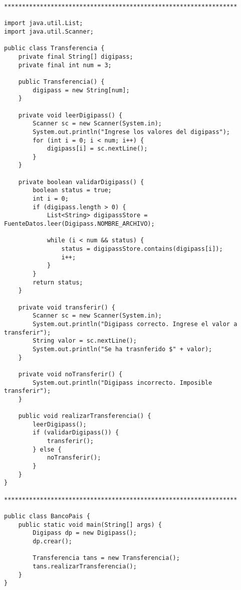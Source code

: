 \documentclass[10pt]{article}
\begin{document}
{\begin{enumerate}
\begin{verbatim}
*****************************************************************

import java.util.List;
import java.util.Scanner;

public class Transferencia {
    private final String[] digipass;
    private final int num = 3;

    public Transferencia() {
        digipass = new String[num];
    }

    private void leerDigipass() {
        Scanner sc = new Scanner(System.in);
        System.out.println("Ingrese los valores del digipass");
        for (int i = 0; i < num; i++) {
            digipass[i] = sc.nextLine();
        }
    }

    private boolean validarDigipass() {
        boolean status = true;
        int i = 0;
        if (digipass.length > 0) {
            List<String> digipassStore = FuenteDatos.leer(Digipass.NOMBRE_ARCHIVO);

            while (i < num && status) {
                status = digipassStore.contains(digipass[i]);
                i++;
            }
        }
        return status;
    }

    private void transferir() {
        Scanner sc = new Scanner(System.in);
        System.out.println("Digipass correcto. Ingrese el valor a transferir");
        String valor = sc.nextLine();
        System.out.println("Se ha trasnferido $" + valor);
    }

    private void noTransferir() {
        System.out.println("Digipass incorrecto. Imposible transferir");
    }

    public void realizarTransferencia() {
        leerDigipass();
        if (validarDigipass()) {
            transferir();
        } else {
            noTransferir();
        }
    }
}

*****************************************************************

public class BancoPais {
    public static void main(String[] args) {
        Digipass dp = new Digipass();
        dp.crear();

        Transferencia tans = new Transferencia();
        tans.realizarTransferencia();
    }
}

\end{verbatim}
    \end{enumerate}}
\end{document}
